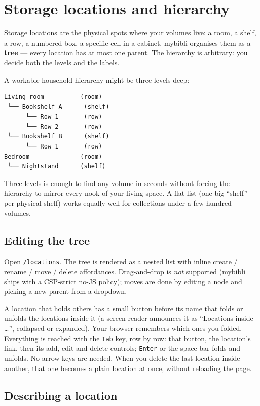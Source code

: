 \section{Storage locations and hierarchy}\label{sec:locations}

Storage locations are the physical spots where your volumes
live: a room, a shelf, a row, a numbered box, a
specific cell in a cabinet. mybibli organises them as a
\textbf{tree} — every location has at most one
parent. The hierarchy is arbitrary: you decide both the levels and
the labels.

A workable household hierarchy might be three levels deep:

\begin{lstlisting}
Living room          (room)
 └── Bookshelf A      (shelf)
      └── Row 1       (row)
      └── Row 2       (row)
 └── Bookshelf B      (shelf)
      └── Row 1       (row)
Bedroom              (room)
 └── Nightstand      (shelf)
\end{lstlisting}

Three levels is enough to find any volume in seconds without forcing
the hierarchy to mirror every nook of your living space. A flat list
(one big ``shelf'' per physical shelf) works equally well for
collections under a few hundred volumes.

\subsection*{Editing the tree}

Open \texttt{/locations}. The tree is rendered as a nested list with
inline create / rename / move / delete affordances. Drag-and-drop is
\emph{not} supported (mybibli ships with a CSP-strict no-JS policy);
moves are done by editing a node and picking a new parent from a
dropdown.

A location that holds others has a small button before its name that
folds or unfolds the locations inside it (a screen reader announces it
as ``Locations inside \dots'', collapsed or expanded). Your browser
remembers which ones you folded. Everything is reached with the
\texttt{Tab} key, row by row: that button, the location's link, then
its add, edit and delete controls; \texttt{Enter} or the space bar
folds and unfolds. No arrow keys are needed. When you delete the last
location inside another, that one becomes a plain location at once,
without reloading the page.

\subsection*{Describing a location}
\label{sec:location-description}

